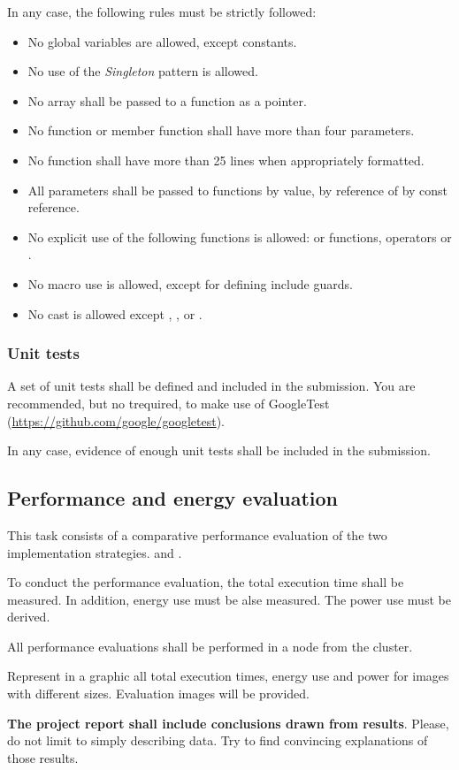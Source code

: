 In any case, the following rules must be strictly followed:

\begin{itemize}
  \item No global variables are allowed, except constants.
  \item No use of the \emph{Singleton} pattern is allowed.
  \item No array shall be passed to a function as a pointer.
  \item No function or member function shall have more than four parameters.
  \item No function shall have more than 25 lines when appropriately formatted.
  \item All parameters shall be passed to functions by value,
        by reference of by const reference.
  \item No explicit use of the following functions is allowed:
         or  functions,
        operators  or .
  \item No macro use is allowed, except for defining include guards.
  \item No cast is allowed except 
        , , 
         or .
\end{itemize}


\subsubsection{Unit tests}

A set of unit tests shall be defined and included in the submission.
You are recommended, but no trequired, to make use of GoogleTest
(\url{https://github.com/google/googletest}).

In any case, evidence of enough unit tests shall be included in the
submission.


\subsection{Performance and energy evaluation}

This task consists of a comparative performance evaluation of the 
two implementation strategies.
 and .

To conduct the performance evaluation, the total execution time shall be measured.
In addition, energy use must be alse measured.
The power use must be derived.

All performance evaluations shall be performed in a node from the
 cluster.

Represent in a graphic all total execution times, energy use and power
for images with different sizes.
Evaluation images will be provided.

\textbf{The project report shall include conclusions drawn from results}.
Please, do not limit to simply describing data.
Try to find convincing explanations of those results.
